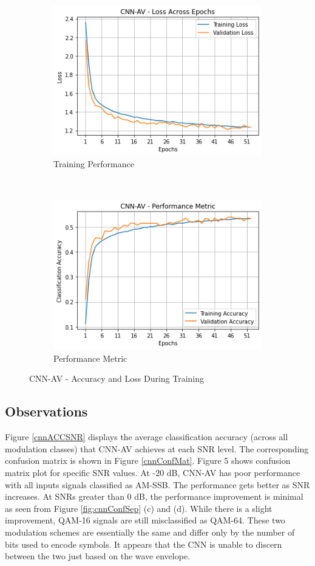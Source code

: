 \documentclass[journal,onecolumn]{IEEEtran}
\begin{document}
\begin{figure}[h]
    \centering
    \begin{subfigure}[b]{0.4\textwidth}
        \centering
        \includegraphics[scale=0.5]{cnnavPerf}
        \caption{Training Performance}
    \end{subfigure}%
    ~ 
    \begin{subfigure}[b]{0.4\textwidth}
        \centering
        \includegraphics[scale=0.5]{cnnavPerfMet}
        \caption{Performance Metric}
    \end{subfigure}
    \caption{CNN-AV - Accuracy and Loss During Training}
    \label{fig:performanceCNN}
\end{figure}

\subsection{Observations}

Figure \ref{cnnACCSNR} displays the average classification accuracy (across all modulation classes) that CNN-AV achieves at each SNR level. The corresponding confusion matrix is shown in Figure \ref{cnnConfMat}. Figure 5 shows confusion matrix plot for specific SNR values. At -20 dB, CNN-AV has poor performance with all inputs signals classified as AM-SSB. The performance gets better as SNR increases. At SNRs greater than 0 dB, the performance improvement is minimal as seen from Figure \ref{fig:cnnConfSep} (c) and (d). While there is a slight improvement, QAM-16 signals are still misclassified as QAM-64. These two modulation schemes are essentially the same and differ only by the number of bits used to encode symbols. It appears that the CNN is unable to discern between the two just based on the wave envelope.
\end{document}
